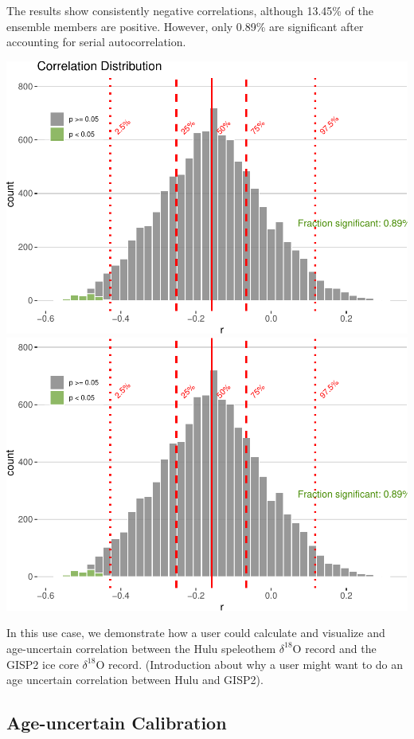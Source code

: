 \documentclass[gc, manuscript]{copernicus}
\begin{document}
The results show consistently negative correlations, although 13.45\% of
the ensemble members are positive. However, only 0.89\% are significant
after accounting for serial autocorrelation.

\includegraphics{geoChronR-paper_files/figure-latex/unnamed-chunk-7-1.pdf}
\includegraphics{geoChronR-paper_files/figure-latex/unnamed-chunk-7-2.pdf}

In this use case, we demonstrate how a user could calculate and
visualize and age-uncertain correlation between the Hulu speleothem
\(\delta^{18}\mathrm{O}\) record and the GISP2 ice core
\(\delta^{18}\mathrm{O}\) record. (Introduction about why a user might
want to do an age uncertain correlation between Hulu and GISP2).

\subsection{Age-uncertain Calibration}
\end{document}
